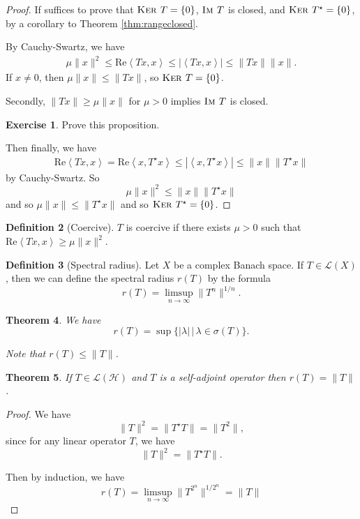 \documentclass[10pt, oneside, reqno]{amsart}
\theoremstyle{plain}%
\newtheorem{thm}{Theorem}[section]
\numberwithin{equation}{section}
\theoremstyle{definition}
\newtheorem{defn}[thm]{Definition}
\newtheorem{exer}[thm]{Exercise}
\theoremstyle{remark}
\newcommand{\given}{ \, | \,}
\newcommand{\im}{\textsc{Im\ }}
\renewcommand{\ker}{\textsc{Ker\ }}
\newcommand{\iprod}[1]{\left\langle #1 \right\rangle}
\renewcommand{\Re}{\text{Re}}
\begin{document}
\begin{proof}
    If suffices to prove that $\ker T = \{ 0 \}$, $\im T$ is closed, and $\ker T^\star = \{ 0 \}$, by a corollary to Theorem \ref{thm:rangeclosed}. 
    
    By Cauchy-Swartz, we have \begin{align*}
        \mu \| x \|^2 \leq \Re\iprod{Tx, x} \leq |\iprod{Tx, x}| \leq \| Tx \| \| x \|.
    \end{align*}  If $x \neq 0$, then $\mu \| x \| \leq \| Tx \|$, so $\ker T = \{ 0 \}$.  
    
    Secondly, $\| Tx \| \geq \mu \| x \|$ for $\mu > 0$ implies $\im T$ is closed.
    
    \begin{exer}
        Prove this proposition.
    \end{exer}
    
    Then finally, we have \begin{align*}
        \Re \iprod{Tx, x} = \Re \iprod{x, T^\star x} \leq | \iprod{x, T^\star x} | \leq \| x \| \|T^\star x \|
    \end{align*} by Cauchy-Swartz.  So \[
        \mu \| x \|^2 \leq \| x \| \| T^\star x \|
    \] and so $\mu \| x \| \leq \| T^\star x \|$ and so $\ker T^\star = \{ 0 \}$.
\end{proof}


\begin{defn}[Coercive]
$T$ is coercive if there exists $\mu > 0$ such that $\Re \iprod{Tx, x} \geq \mu \| x \|^2$.  
\end{defn}


\begin{defn}[Spectral radius]
    Let $X$ be a complex Banach space.  If $T \in \mathcal L(X)$, then we can define the spectral radius $r(T)$ by the formula \[
        r(T) = \limsup_{n \rightarrow \infty} \| T^n \|^{1/n}.
    \]
\end{defn}

\begin{thm} 
    We have \[
        r(T) = \sup \{ |\lambda | \given \lambda \in \sigma(T) \}.
    \]  
    
    Note that $r(T) \leq \| T \|$.  
\end{thm}

\begin{thm} 
    If $T \in \mathcal L(\mathcal H)$ and $T$ is a self-adjoint operator then $r(T) = \| T \|$.   
\end{thm}

\begin{proof}
    We have \[
        \| T \|^2 = \| T^\star T \| = \| T^2 \|,
    \] since for any linear operator $T$, we have \[
        \| T \|^2 = \| T^\star T \|. 
    \]
    
    Then by induction, we have \[
        r(T) = \limsup_{n \rightarrow \infty} \| T^{2^n} \|^{1/2^n} = \| T \|
    \]
\end{proof}
\end{document}
